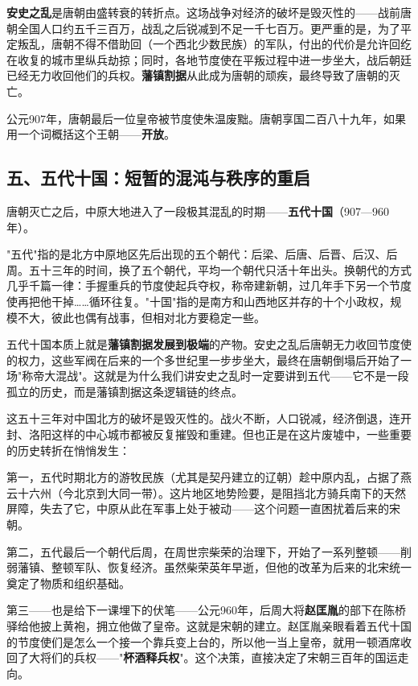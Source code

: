 \documentclass[a4paper,12pt]{ctexart}
\begin{document}
\textbf{安史之乱}是唐朝由盛转衰的转折点。这场战争对经济的破坏是毁灭性的——战前唐朝全国人口约五千三百万，战乱之后锐减到不足一千七百万。更严重的是，为了平定叛乱，唐朝不得不借助回（一个西北少数民族）的军队，付出的代价是允许回纥在收复的城市里纵兵劫掠；同时，各地节度使在平叛过程中进一步坐大，战后朝廷已经无力收回他们的兵权。\textbf{藩镇割据}从此成为唐朝的顽疾，最终导致了唐朝的灭亡。

公元907年，唐朝最后一位皇帝被节度使朱温废黜。唐朝享国二百八十九年，如果用一个词概括这个王朝——\textbf{开放}。

\subsection*{五、五代十国：短暂的混沌与秩序的重启}

唐朝灭亡之后，中原大地进入了一段极其混乱的时期——\textbf{五代十国}（907—960年）。

"五代"指的是北方中原地区先后出现的五个朝代：后梁、后唐、后晋、后汉、后周。五十三年的时间，换了五个朝代，平均一个朝代只活十年出头。换朝代的方式几乎千篇一律：手握重兵的节度使起兵夺权，称帝建新朝，过几年手下另一个节度使再把他干掉……循环往复。"十国"指的是南方和山西地区并存的十个小政权，规模不大，彼此也偶有战事，但相对北方要稳定一些。

五代十国本质上就是\textbf{藩镇割据发展到极端}的产物。安史之乱后唐朝无力收回节度使的权力，这些军阀在后来的一个多世纪里一步步坐大，最终在唐朝倒塌后开始了一场"称帝大混战"。这就是为什么我们讲安史之乱时一定要讲到五代——它不是一段孤立的历史，而是藩镇割据这条逻辑链的终点。

这五十三年对中国北方的破坏是毁灭性的。战火不断，人口锐减，经济倒退，连开封、洛阳这样的中心城市都被反复摧毁和重建。但也正是在这片废墟中，一些重要的历史转折在悄悄发生：

第一，五代时期北方的游牧民族（尤其是契丹建立的辽朝）趁中原内乱，占据了燕云十六州（今北京到大同一带）。这片地区地势险要，是阻挡北方骑兵南下的天然屏障，失去了它，中原从此在军事上处于被动——这个问题一直困扰着后来的宋朝。

第二，五代最后一个朝代后周，在周世宗柴荣的治理下，开始了一系列整顿——削弱藩镇、整顿军队、恢复经济。虽然柴荣英年早逝，但他的改革为后来的北宋统一奠定了物质和组织基础。

第三——也是给下一课埋下的伏笔——公元960年，后周大将\textbf{赵匡胤}的部下在陈桥驿给他披上黄袍，拥立他做了皇帝。这就是宋朝的建立。赵匡胤亲眼看着五代十国的节度使们是怎么一个接一个靠兵变上台的，所以他一当上皇帝，就用一顿酒席收回了大将们的兵权——"\textbf{杯酒释兵权}"。这个决策，直接决定了宋朝三百年的国运走向。
\end{document}
